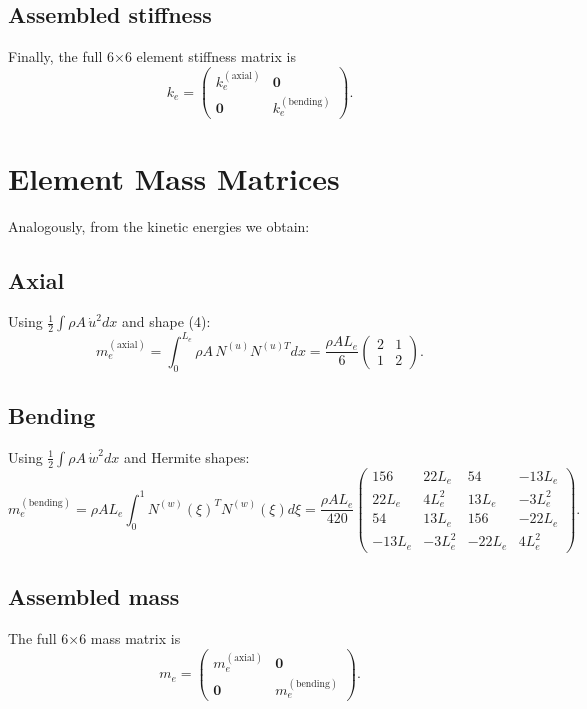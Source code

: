 \documentclass[preprint,12pt]{elsarticle}
\begin{document}
	\subsection{Assembled stiffness}
	Finally, the full 6×6 element stiffness matrix is
	\[
	k_e
	= \begin{pmatrix}
		k_e^{(\mathrm{axial})} & \mathbf{0}\\
		\mathbf{0}            & k_e^{(\mathrm{bending})}
	\end{pmatrix}.
	\tag{8}
	\]
	
	\section{Element Mass Matrices}
	Analogously, from the kinetic energies we obtain:
	
	\subsection{Axial}
	Using \(\tfrac12\int\rho A\,\dot u^2dx\) and shape (4):
	\[
	m_e^{(\mathrm{axial})}
	= \int_0^{L_e}\rho A\,N^{(u)}N^{(u)T}dx
	= \frac{\rho A L_e}{6}
	\begin{pmatrix}2 & 1\\ 1 & 2\end{pmatrix}.
	\tag{9}
	\]
	
	\subsection{Bending}
	Using \(\tfrac12\int\rho A\,\dot w^2dx\) and Hermite shapes:
	\[
	m_e^{(\mathrm{bending})}
	= \rho A L_e\int_0^1N^{(w)}(\xi)^T N^{(w)}(\xi)d\xi
	= \frac{\rho A L_e}{420}
	\begin{pmatrix}
		156 & 22L_e & 54 & -13L_e\\
		22L_e & 4L_e^2 & 13L_e & -3L_e^2\\
		54 & 13L_e & 156 & -22L_e\\
		-13L_e & -3L_e^2 & -22L_e & 4L_e^2
	\end{pmatrix}.
	\tag{10}
	\]
	
	\subsection{Assembled mass}
	The full 6×6 mass matrix is
	\[
	m_e
	= \begin{pmatrix}
		m_e^{(\mathrm{axial})} & \mathbf{0}\\
		\mathbf{0}            & m_e^{(\mathrm{bending})}
	\end{pmatrix}.
	\tag{11}
	\]
	
	
	
	
\end{document}
